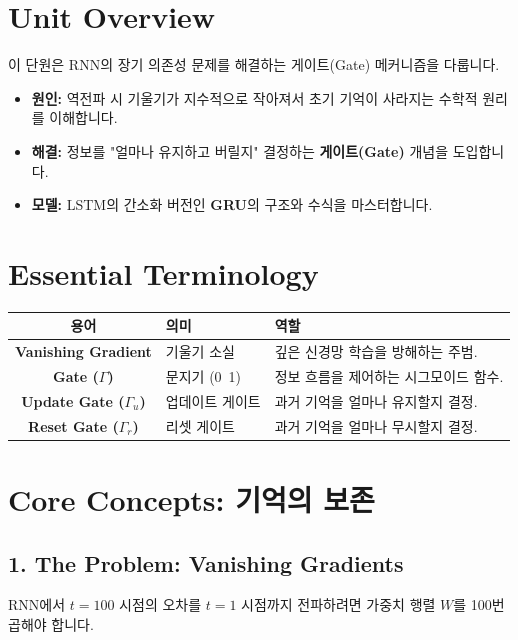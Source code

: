 \documentclass[11pt,a4paper]{book}
\theoremstyle{definition}
\begin{document}
\section{Unit Overview}
\begin{summarybox}[title={핵심 목표}]
이 단원은 RNN의 장기 의존성 문제를 해결하는 게이트(Gate) 메커니즘을 다룹니다.
\begin{itemize}
    \item \textbf{원인:} 역전파 시 기울기가 지수적으로 작아져서 초기 기억이 사라지는 수학적 원리를 이해합니다.
    \item \textbf{해결:} 정보를 "얼마나 유지하고 버릴지" 결정하는 \textbf{게이트(Gate)} 개념을 도입합니다.
    \item \textbf{모델:} LSTM의 간소화 버전인 \textbf{GRU}의 구조와 수식을 마스터합니다.
\end{itemize}
\end{summarybox}

\section{Essential Terminology}
\begin{center}
\begin{tabular}{|c|l|l|}
\hline
\textbf{용어} & \textbf{의미} & \textbf{역할} \\ \hline
\textbf{Vanishing Gradient} & 기울기 소실 & 깊은 신경망 학습을 방해하는 주범. \\ \hline
\textbf{Gate ($\Gamma$)} & 문지기 (0~1) & 정보 흐름을 제어하는 시그모이드 함수. \\ \hline
\textbf{Update Gate ($\Gamma_u$)} & 업데이트 게이트 & 과거 기억을 얼마나 유지할지 결정. \\ \hline
\textbf{Reset Gate ($\Gamma_r$)} & 리셋 게이트 & 과거 기억을 얼마나 무시할지 결정. \\ \hline
\end{tabular}
\end{center}

\section{Core Concepts: 기억의 보존}

\subsection{1. The Problem: Vanishing Gradients}
RNN에서 $t=100$ 시점의 오차를 $t=1$ 시점까지 전파하려면 가중치 행렬 $W$를 100번 곱해야 합니다.
\end{document}

